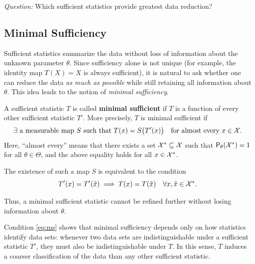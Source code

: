 \medskip

\emph{Question:} Which sufficient statistics provide greatest data reduction?

\subsection{Minimal Sufficiency}
\label{sub:ms}

Sufficient statistics summarize the data without loss of information about the unknown parameter
$\theta$. Since sufficiency alone is not unique (for example, the identity map $T(X)=X$ is always
sufficient), it is natural to ask whether one can reduce the data \emph{as much as possible} while
still retaining all information about $\theta$.
This idea leads to the notion of \emph{minimal sufficiency}.

\begin{definition}
A sufficient statistic $T$ is called \textbf{minimal sufficient} if $T$ is a function of every
other sufficient statistic $T'$. More precisely, $T$ is minimal sufficient if
\[
\exists \text{ a measurable map } S \text{ such that } T(x) = S\bigl(T'(x)\bigr)
\quad \text{for almost every } x \in \mathcal{X}.
\]
Here, ``almost every'' means that there exists a set $\mathcal{X}^* \subseteq \mathcal{X}$ such that
$\mathsf{P}_\theta(\mathcal{X}^*) = 1$ for all $\theta \in \Theta$, and the above equality holds for all
$x \in \mathcal{X}^*$.

The existence of such a map $S$ is equivalent to the condition
\begin{equation}
\label{eq:ms}
T'(x) = T'(\tilde{x}) \implies T(x) = T(\tilde{x})
\quad \forall x,\tilde{x} \in \mathcal{X}^*.
\end{equation}
\end{definition}

Thus, a minimal sufficient statistic cannot be refined further without losing information about
$\theta$.

Condition \eqref{eq:ms} shows that minimal sufficiency depends only on how statistics identify
data sets: whenever two data sets are indistinguishable under a sufficient statistic $T'$, they
must also be indistinguishable under $T$. In this sense, $T$ induces a coarser classification of
the data than any other sufficient statistic.

